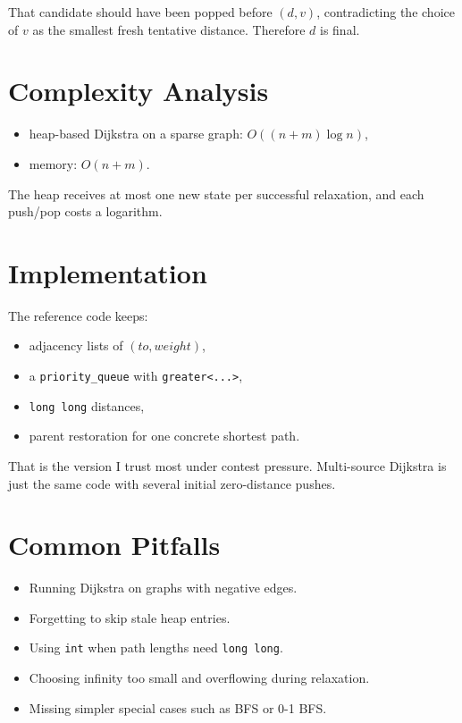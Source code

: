 That candidate should have been popped before \((d, v)\), contradicting the choice of \(v\) as the smallest fresh
tentative distance. Therefore \(d\) is final.

\section*{Complexity Analysis}

\begin{itemize}
  \item heap-based Dijkstra on a sparse graph: \(O((n + m)\log n)\),
  \item memory: \(O(n + m)\).
\end{itemize}

The heap receives at most one new state per successful relaxation, and each push/pop costs a logarithm.

\section*{Implementation}

The reference code keeps:

\begin{itemize}
  \item adjacency lists of \((to, weight)\),
  \item a \texttt{priority\_queue} with \texttt{greater<...>},
  \item \texttt{long long} distances,
  \item parent restoration for one concrete shortest path.
\end{itemize}

That is the version I trust most under contest pressure. Multi-source Dijkstra is just the same code with several
initial zero-distance pushes.

\section*{Common Pitfalls}

\begin{itemize}
  \item Running Dijkstra on graphs with negative edges.
  \item Forgetting to skip stale heap entries.
  \item Using \texttt{int} when path lengths need \texttt{long long}.
  \item Choosing infinity too small and overflowing during relaxation.
  \item Missing simpler special cases such as BFS or 0-1 BFS.
\end{itemize}

